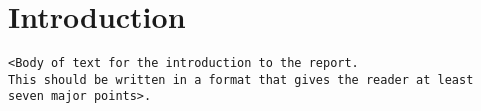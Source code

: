 \section{Introduction}
\begin{verbatim}
<Body of text for the introduction to the report. 
This should be written in a format that gives the reader at least 
seven major points>. 
\end{verbatim}
